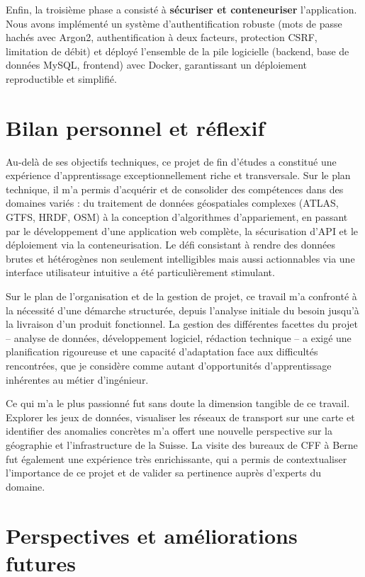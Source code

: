Enfin, la troisième phase a consisté à \textbf{sécuriser et conteneuriser} l'application. Nous avons implémenté un système d'authentification robuste (mots de passe hachés avec Argon2, authentification à deux facteurs, protection CSRF, limitation de débit) et déployé l'ensemble de la pile logicielle (backend, base de données MySQL, frontend) avec Docker, garantissant un déploiement reproductible et simplifié.

\section*{Bilan personnel et réflexif}

Au-delà de ses objectifs techniques, ce projet de fin d'études a constitué une expérience d'apprentissage exceptionnellement riche et transversale. Sur le plan technique, il m'a permis d'acquérir et de consolider des compétences dans des domaines variés : du traitement de données géospatiales complexes (ATLAS, GTFS, HRDF, OSM) à la conception d'algorithmes d'appariement, en passant par le développement d'une application web complète, la sécurisation d'API et le déploiement via la conteneurisation. Le défi consistant à rendre des données brutes et hétérogènes non seulement intelligibles mais aussi actionnables via une interface utilisateur intuitive a été particulièrement stimulant.

Sur le plan de l'organisation et de la gestion de projet, ce travail m'a confronté à la nécessité d'une démarche structurée, depuis l'analyse initiale du besoin jusqu'à la livraison d'un produit fonctionnel. La gestion des différentes facettes du projet – analyse de données, développement logiciel, rédaction technique – a exigé une planification rigoureuse et une capacité d'adaptation face aux difficultés rencontrées, que je considère comme autant d'opportunités d'apprentissage inhérentes au métier d'ingénieur.

Ce qui m'a le plus passionné fut sans doute la dimension tangible de ce travail. Explorer les jeux de données, visualiser les réseaux de transport sur une carte et identifier des anomalies concrètes m'a offert une nouvelle perspective sur la géographie et l'infrastructure de la Suisse. La visite des bureaux de CFF à Berne fut également une expérience très enrichissante, qui a permis de contextualiser l'importance de ce projet et de valider sa pertinence auprès d'experts du domaine.

\section*{Perspectives et améliorations futures}

